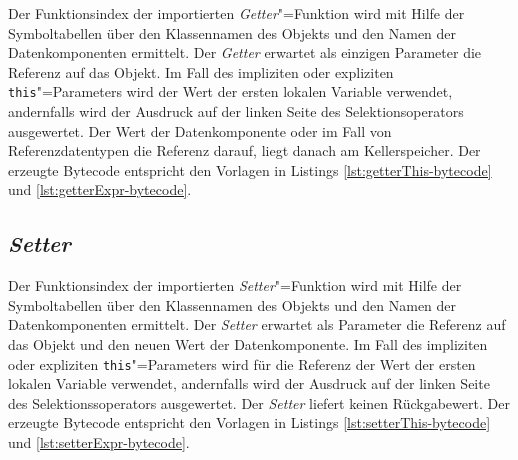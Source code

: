 Der Funktionsindex der importierten \emph{Getter}"=Funktion wird mit Hilfe der Symboltabellen über den Klassennamen des Objekts und den Namen der Datenkomponenten ermittelt. Der \emph{Getter} erwartet als einzigen Parameter die Referenz auf das Objekt. Im Fall des impliziten oder expliziten \lstinline{this}"=Parameters wird der Wert der ersten lokalen Variable verwendet, andernfalls wird der Ausdruck auf der linken Seite des Selektionsoperators ausgewertet. Der Wert der Datenkomponente oder im Fall von Referenzdatentypen die Referenz darauf, liegt danach am Kellerspeicher. Der erzeugte Bytecode entspricht den Vorlagen in Listings \ref{lst:getterThis-bytecode} und \ref{lst:getterExpr-bytecode}.



\pagebreak


\subsection{\emph{Setter}}
\label{subsec:Zugriff-auf-Datenkomponenten-Setter}

Der Funktionsindex der importierten \emph{Setter}"=Funktion wird mit Hilfe der Symboltabellen über den Klassennamen des Objekts und den Namen der Datenkomponenten ermittelt. Der \emph{Setter} erwartet als Parameter die Referenz auf das Objekt und den neuen Wert der Datenkomponente. Im Fall des impliziten oder expliziten \lstinline{this}"=Parameters wird für die Referenz der Wert der ersten lokalen Variable verwendet, andernfalls wird der Ausdruck auf der linken Seite des Selektionssoperators ausgewertet. Der \emph{Setter} liefert keinen Rückgabewert. Der erzeugte Bytecode entspricht den Vorlagen in Listings \ref{lst:setterThis-bytecode} und \ref{lst:setterExpr-bytecode}.



